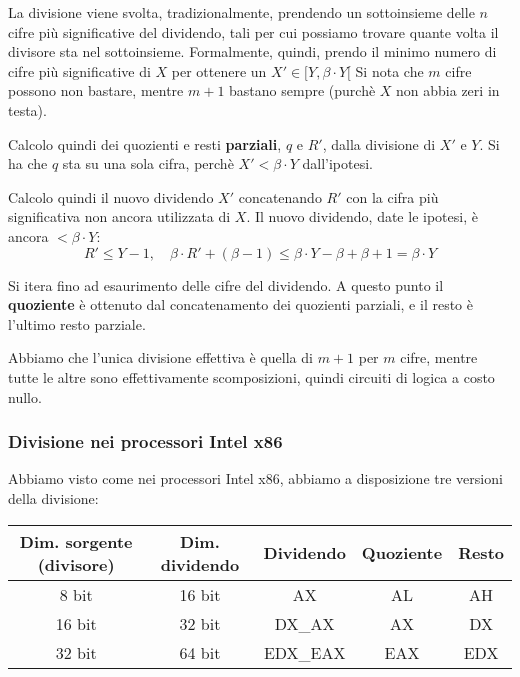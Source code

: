 \documentclass[a4paper,11pt]{article}
\begin{document}
La divisione viene svolta, tradizionalmente, prendendo un sottoinsieme delle $n$ cifre più significative del dividendo, tali per cui possiamo trovare quante volta il divisore sta nel sottoinsieme.
Formalmente, quindi, prendo il minimo numero di cifre più significative di $X$ per ottenere un $X' \in [Y, \beta \cdot Y[$
Si nota che $m$ cifre possono non bastare, mentre $m+1$ bastano sempre (purchè $X$ non abbia zeri in testa).

Calcolo quindi dei quozienti e resti \textbf{parziali}, $q$ e $R'$, dalla divisione di $X'$ e $Y$.
Si ha che $q$ sta su una sola cifra, perchè $X' < \beta \cdot Y$ dall'ipotesi.

Calcolo quindi il nuovo dividendo $X'$ concatenando $R'$ con la cifra più significativa non ancora utilizzata di $X$.
Il nuovo dividendo, date le ipotesi, è ancora $< \beta \cdot Y$:
$$
R' \leq Y - 1, \quad \beta \cdot R' + (\beta - 1) \leq \beta \cdot  Y - \beta + \beta + 1 = \beta \cdot Y
$$

Si itera fino ad esaurimento delle cifre del dividendo.
A questo punto il \textbf{quoziente} è ottenuto dal concatenamento dei quozienti parziali, e il resto è l'ultimo resto parziale.

\par\smallskip

Abbiamo che l'unica divisione effettiva è quella di $m+1$ per $m$ cifre, mentre tutte le altre sono effettivamente scomposizioni, quindi circuiti di logica a costo nullo.

\subsubsection{Divisione nei processori Intel x86}
Abbiamo visto come nei processori Intel x86, abbiamo a disposizione tre versioni della divisione:

\begin{table}[h!]
	\center {}
	\begin{tabular} { c | c | c | c | c }
		\bfseries Dim. sorgente (divisore) & \bfseries Dim. dividendo & \bfseries Dividendo & \bfseries Quoziente & \bfseries Resto \\ 
		\hline 
		8 bit & 16 bit & AX & AL & AH \\ 
		16 bit & 32 bit & DX\_AX & AX & DX \\ 
		32 bit & 64 bit & EDX\_EAX & EAX & EDX
	\end{tabular}
\end{table}
\end{document}

